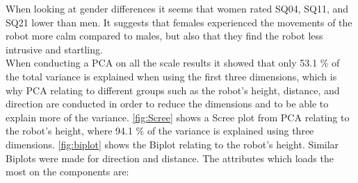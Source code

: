 When looking at gender differences it seems that women rated SQ04, SQ11, and SQ21 lower than men. It suggests that females experienced the movements of the robot more calm compared to males, but also that they find the robot less intrusive and startling.\\

\noindent
When conducting a PCA on all the scale results it showed that only 53.1 \% of the total variance is explained when using the first three dimensions, which is why PCA relating to different groups such as the robot's height, distance, and direction are conducted in order to reduce the dimensions and to be able to explain more of the variance. \autoref{fig:Scree} shows a Scree plot from PCA relating to the robot's height, where 94.1 \% of the variance is explained using three dimensions. \autoref{fig:biplot} shows the Biplot relating to the robot's height. Similar Biplots were made for direction and distance. The attributes which loads the most on the components are:

